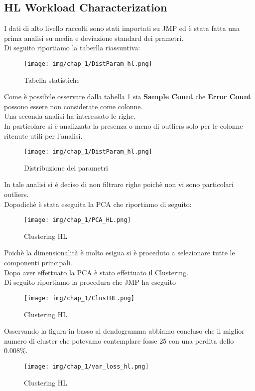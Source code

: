 \subsection{HL Workload Characterization}
I dati di alto livello raccolti sono stati importati su JMP ed è stata fatta una prima analisi su media e deviazione standard dei prametri.\\
Di seguito riportiamo la taberlla riassuntiva:
\begin{figure}[H]
    \centering
    \texttt{[image: img/chap\_1/DistParam\_hl.png]}
    \caption{Tabella statistiche}
    \label{fig:stats_hl}
\end{figure}
\noindent
Come è possibile osservare dalla tabella \ref{fig:stats_hl} sia \textbf{Sample Count} che \textbf{Error Count} possono essere non considerate come colonne.\\
Una seconda analisi ha interessato le righe.\\
In particolare si è analizzata la presenza o meno di outliers solo per le colonne ritenute utili per l'analisi.\\
\begin{figure}[H]
    \centering
    \texttt{[image: img/chap\_1/DistParam\_hl.png]}
    \caption{Distribuzione dei parametri}
    \label{fig:dist_param}
\end{figure}
\noindent
In tale analisi si è deciso di non filtrare righe poichè non vi sono particolari outliers.\\
Dopodichè è stata eseguita la PCA che riportiamo di seguito:
\begin{figure}[H]
    \centering
    \texttt{[image: img/chap\_1/PCA\_HL.png]}
    \caption{Clustering HL}
    \label{fig:clust_hl}
\end{figure}
\noindent
Poichè la dimensionalità è molto esigua  si è proceduto a selezionare tutte le componenti principali.\\
Dopo aver effettuato la PCA è stato effettuato il Clustering.\\
Di seguito riportiamo la procedura che JMP ha eseguito 
\begin{figure}[H]
    \centering
    \texttt{[image: img/chap\_1/ClustHL.png]}
    \caption{Clustering HL}
    \label{fig:clust_hl}
\end{figure}
\noindent
Osservando la figura in basso al dendogramma abbiamo concluso che il miglior numero di cluster che potevamo contemplare fosse 25 con una perdita dello 0.008\%.\\
\begin{figure}[H]
    \centering
    \texttt{[image: img/chap\_1/var\_loss\_hl.png]}
    \caption{Clustering HL}
    \label{fig:clust_hl}
\end{figure}
